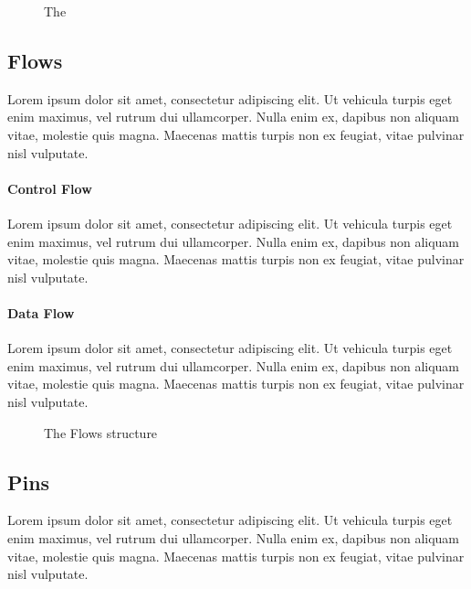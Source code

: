 \begin{figure}[!ht]
\centering

\caption{The }
\label{fig:composite_activity}
\end{figure}

\subsection{Flows}

Lorem ipsum dolor sit amet, consectetur adipiscing elit. Ut vehicula turpis eget enim maximus, vel rutrum dui ullamcorper. Nulla enim ex, dapibus non aliquam vitae, molestie quis magna. Maecenas mattis turpis non ex feugiat, vitae pulvinar nisl vulputate.

\paragraph{Control Flow}

Lorem ipsum dolor sit amet, consectetur adipiscing elit. Ut vehicula turpis eget enim maximus, vel rutrum dui ullamcorper. Nulla enim ex, dapibus non aliquam vitae, molestie quis magna. Maecenas mattis turpis non ex feugiat, vitae pulvinar nisl vulputate.

\paragraph{Data Flow}

Lorem ipsum dolor sit amet, consectetur adipiscing elit. Ut vehicula turpis eget enim maximus, vel rutrum dui ullamcorper. Nulla enim ex, dapibus non aliquam vitae, molestie quis magna. Maecenas mattis turpis non ex feugiat, vitae pulvinar nisl vulputate.

\begin{figure}[!ht]
	\centering
	
	\caption{The Flows structure}
	\label{fig:flows}
\end{figure}

\subsection{Pins}

Lorem ipsum dolor sit amet, consectetur adipiscing elit. Ut vehicula turpis eget enim maximus, vel rutrum dui ullamcorper. Nulla enim ex, dapibus non aliquam vitae, molestie quis magna. Maecenas mattis turpis non ex feugiat, vitae pulvinar nisl vulputate.

